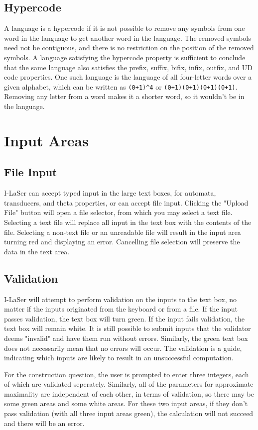 \documentclass{article}
\begin{document}
\subsection{Hypercode}
A language is a hypercode if it is not possible to remove any symbols from one word in the language to get another word in the language. The removed symbols need not be contiguous, and there is no restriction on the position of the removed symbols. A language satisfying the hypercode property is sufficient to conclude that the same language also satisfies the prefix, suffix, bifix, infix, outfix, and UD code properties. One such language is the language of all four-letter words over a given alphabet, which can be written as \verb-(0+1)^4- or \verb-(0+1)(0+1)(0+1)(0+1)-. Removing any letter from a word makes it a shorter word, so it wouldn't be in the language.

\section{Input Areas}

\subsection{File Input}
I-LaSer can accept typed input in the large text boxes, for automata, transducers, and theta properties, or can accept file input. Clicking the "Upload File" button will open a file selector, from which you may select a text file. Selecting a text file will replace all input in the text box with the contents of the file. Selecting a non-text file or an unreadable file will result in the input area turning red and displaying an error. Cancelling file selection will preserve the data in the text area.

\subsection{Validation}
I-LaSer will attempt to perform validation on the inputs to the text box, no matter if the inputs originated from the keyboard or from a file. If the input passes validation, the text box will turn green. If the input fails validation, the text box will remain white. It is still possible to submit inputs that the validator deems "invalid" and have them run without errors. Similarly, the green text box does not necessarily mean that no errors will occur.
The validation is a guide, indicating which inputs are likely to result in an unsuccessful computation.
\par For the construction question, the user is prompted to enter three integers, each of which are validated seperately.
Similarly, all of the parameters for approximate maximality are independent of each other, in terms of validation, so there may be some green areas and some white areas.
For these two input areas, if they don't pass validation (with all three input areas green), the calculation will not succeed and there will be an error.
\end{document}
